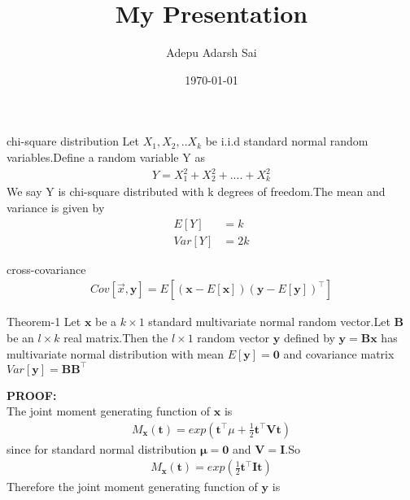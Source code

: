 \documentclass{beamer}
\title{My Presentation}
\author{Adepu Adarsh Sai}
\institute{IITH(AI)}
\date{\today}
\renewcommand{\vec}[1]{\mathbf{#1}}
\providecommand{\brak}[1]{\ensuremath{\left(#1\right)}}
\providecommand{\mean}[1]{E[ #1 ]}
\providecommand{\sbrak}[1]{\ensuremath{{}\left[#1\right]}}
\begin{document}
\begin{frame}
\titlepage
\end{frame}
\begin{frame}
   \begin{block}{chi-square distribution}
 Let $X_1,X_2,..X_k$ be i.i.d  standard normal random variables.Define a random variable Y as
 \begin{align}
     Y=X_1^2+X_2^2+....+X_k^2
 \end{align}
 We say Y is chi-square distributed with k degrees of freedom.The mean and variance is given by
 \begin{align}
   \mean{Y}&=k\\
   Var\sbrak{Y}&=2k
 \end{align}
\end{block} 
\begin{block}{cross-covariance}
\begin{align}
    Cov\sbrak{\Vec{x},\vec{y}}=\mean{\brak{\vec{x}-\mean{\vec{x}}}\brak{\vec{y}-\mean{\vec{y}}}^{\top}}
\end{align}
\end{block}
\end{frame}
\begin{frame}
 \begin{block}{Theorem-1}
 Let $\vec{x}$ be a $k\times 1$ standard multivariate normal random vector.Let $\vec{B}$ be an $l\times k$ real matrix.Then the $l\times 1$ random vector $\vec{y}$ defined by $\vec{y}=\vec{B}\vec{x}$ has multivariate normal distribution with mean $\mean{\vec{y}}=\vec{0}$ and covariance matrix $Var\sbrak{\vec{y}}=\vec{B}\vec{B}^{\top}$ 
 \end{block}
 \textbf{PROOF:}\\
The joint moment generating function of $\vec{x}$ is
\begin{align}
    M_{\vec{x}}\brak{\vec{t}}=exp\brak{\vec{t}^{\top}\mu+\frac{1}{2}\vec{t}^{\top}\vec{V}\vec{t}}
\end{align}
since for standard normal distribution $\vec{\mu}=\vec{0}$ and $\vec{V}=\vec{I}$.So
\begin{align}
     M_{\vec{x}}\brak{\vec{t}}=exp\brak{\frac{1}{2}\vec{t}^{\top}\vec{I}\vec{t}}\label{2.11}
\end{align}
Therefore the joint moment generating function of $\vec{y}$ is
\end{frame}
\end{document}
